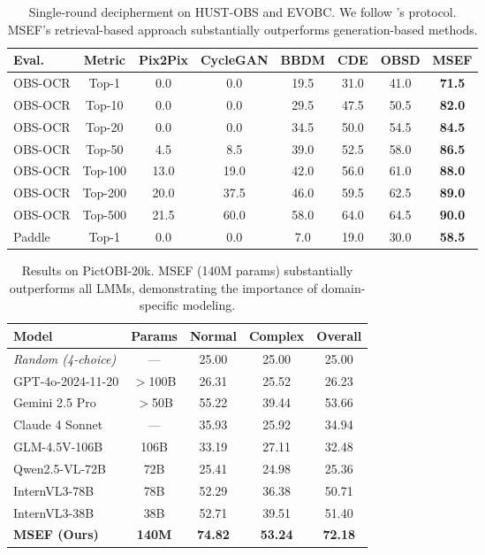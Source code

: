 \documentclass{article}
\begin{document}
\begin{table}[t]
\centering
\small
\caption{Single-round decipherment on HUST-OBS and EVOBC. We follow \cite{guan2024deciphering}'s protocol. MSEF's retrieval-based approach substantially outperforms generation-based methods.}
\label{tab:hust_evobc_results}
\setlength{\tabcolsep}{1.5pt}
\begin{tabular}{lccccccc}
\toprule
\textbf{Eval.} & \textbf{Metric} & \textbf{Pix2Pix} & \textbf{CycleGAN} & \textbf{BBDM} & \textbf{CDE} & \textbf{OBSD} & \textbf{MSEF} \\
\midrule
OBS-OCR & Top-1 & 0.0 & 0.0 & 19.5 & 31.0 & 41.0 & \textbf{71.5} \\
OBS-OCR & Top-10 & 0.0 & 0.0 & 29.5 & 47.5 & 50.5 & \textbf{82.0} \\
OBS-OCR & Top-20 & 0.0 & 0.0 & 34.5 & 50.0 & 54.5 & \textbf{84.5} \\
OBS-OCR & Top-50 & 4.5 & 8.5 & 39.0 & 52.5 & 58.0 & \textbf{86.5} \\
OBS-OCR & Top-100 & 13.0 & 19.0 & 42.0 & 56.0 & 61.0 & \textbf{88.0} \\
OBS-OCR & Top-200 & 20.0 & 37.5 & 46.0 & 59.5 & 62.5 & \textbf{89.0} \\
OBS-OCR & Top-500 & 21.5 & 60.0 & 58.0 & 64.0 & 64.5 & \textbf{90.0} \\
\midrule
Paddle & Top-1 & 0.0 & 0.0 & 7.0 & 19.0 & 30.0 & \textbf{58.5} \\
\bottomrule
\end{tabular}
\end{table}

\begin{table}[t]
\centering
\small
\caption{Results on PictOBI-20k. MSEF (140M params) substantially outperforms all LMMs, demonstrating the importance of domain-specific modeling.}
\label{tab:pictobi_results}
\begin{tabular}{lcccc}
\toprule
\textbf{Model} & \textbf{Params} & \textbf{Normal} & \textbf{Complex} & \textbf{Overall} \\
\midrule
\textit{Random (4-choice)} & --- & 25.00 & 25.00 & 25.00 \\
\midrule
GPT-4o-2024-11-20 & $>$100B & 26.31 & 25.52 & 26.23 \\
Gemini 2.5 Pro & $>$50B & 55.22 & 39.44 & 53.66 \\
Claude 4 Sonnet & --- & 35.93 & 25.92 & 34.94 \\
GLM-4.5V-106B & 106B & 33.19 & 27.11 & 32.48 \\
Qwen2.5-VL-72B & 72B & 25.41 & 24.98 & 25.36 \\
InternVL3-78B & 78B & 52.29 & 36.38 & 50.71 \\
InternVL3-38B & 38B & 52.71 & 39.51 & 51.40 \\
\midrule
\rowcolor{gray!10}
\textbf{MSEF (Ours)} & \textbf{140M} & \textbf{74.82} & \textbf{53.24} & \textbf{72.18} \\
\bottomrule
\end{tabular}
\end{table}
\end{document}
